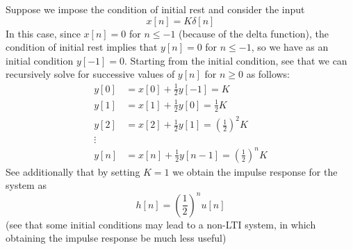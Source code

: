 \documentclass{report}
\begin{document}
Suppose we impose the condition of initial rest and consider the input
\begin{equation*}
x[n]=K\delta[n]
\end{equation*}
In this case, since $x[n]=0$ for $n\leq-1$ (because of the delta function), the condition of initial rest implies that $y[n]=0$ for
$n\leq-1$, so we have as an initial condition $y[-1]=0$. Starting from the initial condition, see that we can recursively solve
for successive values of $y[n]$ for $n\geq0$ as follows:
\begin{align*}
y[0]&=x[0]+\frac{1}{2}y[-1]=K\\
y[1]&=x[1]+\frac{1}{2}y[0]=\frac{1}{2}K\\
y[2]&=x[2]+\frac{1}{2}y[1]=\left(\frac{1}{2}\right)^2K\\
\vdots&\\
y[n]&=x[n]+\frac{1}{2}y[n-1]=\left(\frac{1}{2}\right)^nK
\end{align*}
See additionally that by setting $K=1$ we obtain the impulse response for the system as
\begin{equation*}
h[n]=\left(\frac{1}{2}\right)^nu[n]
\end{equation*}
(see that some initial conditions may lead to a non-LTI system, in which obtaining the impulse response be much less useful)
\newpage
\end{document}
